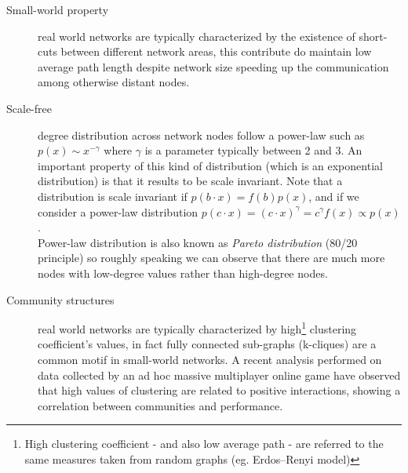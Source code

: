 \begin{description}

\item[Small-world property] real world networks are typically characterized by the existence of short-cuts between different network areas, this contribute do maintain low average path length despite network size\cite[2.2.1]{citeulike:481248} speeding up the communication among otherwise distant nodes.

\item[Scale-free] degree distribution across network nodes follow a power-law such as $p(x) \sim x^{-\gamma}$ where $\gamma$ is a parameter typically between 2 and 3. An important property of this kind of distribution (which is an exponential distribution) is that it results to be scale invariant. Note that a distribution is scale invariant if $p(b \cdot x) = f(b) p(x)$, and if we consider a power-law distribution $p(c \cdot x) = (c \cdot x)^\gamma = c^\gamma f(x) \propto p(x)$.\\ 
Power-law distribution is also known as \emph{Pareto distribution} (80/20 principle) so roughly speaking we can observe that there are much more nodes with low-degree values rather than high-degree nodes.

\item[Community structures] real world networks are typically characterized by high\footnote{High clustering coefficient - and also low average path - are referred to the same measures taken from random graphs (eg. Erdos–Renyi model) } clustering coefficient's values, in fact fully connected sub-graphs (k-cliques) are a common motif in small-world networks\cite[2.1.5]{citeulike:481248}. A recent analysis performed on data collected by an ad hoc massive multiplayer online game\cite{citeulike:6926207} have observed that high values of clustering are related to positive interactions, showing a correlation between communities and performance.

\end{description}

